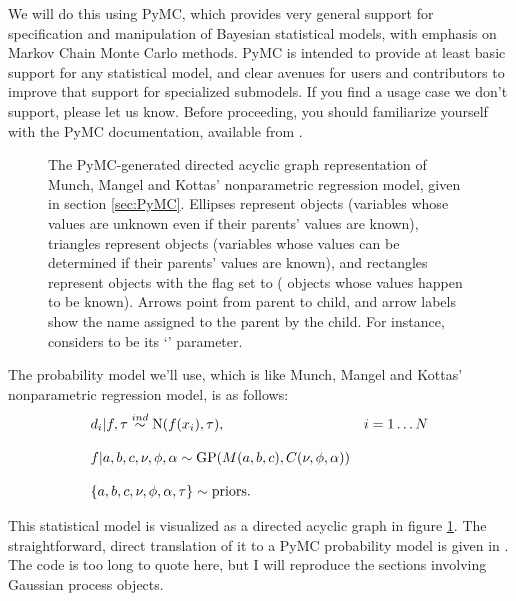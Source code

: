 \documentclass{manual}
\begin{document}
We will do this using PyMC, which provides very general support for specification and manipulation of Bayesian statistical models, with emphasis on Markov Chain Monte Carlo methods. PyMC is intended to provide at least basic support for any statistical model, and clear avenues for users and contributors to improve that support for specialized submodels. If you find a usage case we don't support, please let us know. Before proceeding, you should familiarize yourself with the PyMC documentation, available from .

\begin{figure}
	\centering
	\caption{The PyMC-generated directed acyclic graph representation of Munch, Mangel and Kottas' nonparametric regression model, given in section \ref{sec:PyMC}. Ellipses represent  objects (variables whose values are unknown even if their parents' values are known), triangles represent  objects (variables whose values can be determined if their parents' values are known), and rectangles represent  objects with the  flag set to  ( objects whose values happen to be known). Arrows point from parent to child, and arrow labels show the name assigned to the parent by the child. For instance,  considers  to be its `' parameter.}
	\label{fig:unobservedModel}
\end{figure}

The probability model we'll use, which is like Munch, Mangel and Kottas' nonparametric regression model, is as follows:
\begin{equation}
	\label{eqn:npregression}
	\begin{array}{ll}
		d_i|f,\tau\stackrel{{\tiny ind}}{\sim} \textup N(f(x_i), \tau),&i=1\ldots N\\\\
		f|a,b,c,\nu,\phi,\alpha\sim\textup{GP}(M(a,b,c),C(\nu,\phi,\alpha))&\\\\
		\{a,b,c,\nu,\phi,\alpha,\tau\} \sim \textup{priors}.
	\end{array}
\end{equation}

This statistical model is visualized as a directed acyclic graph in figure \ref{fig:unobservedModel}. The straightforward, direct translation of it to a PyMC probability model is given in . The code is too long to quote here, but I will reproduce the sections involving Gaussian process objects. 
\end{document}
